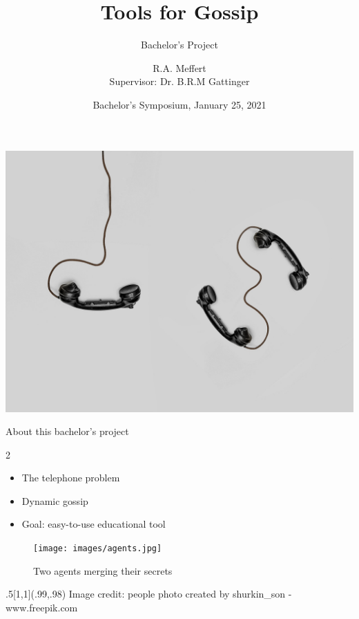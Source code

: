 \documentclass[aspectratio=169]{beamer}
\title{Tools for Gossip}
\subtitle{Bachelor's Project}
\author{%
    R.A. Meffert\\\vspace{5pt}
    {\small Supervisor: Dr. B.R.M Gattinger} 
}
\institute{University of Groningen}
\date{Bachelor's Symposium, January 25, 2021}
\begin{document}
{
{\includegraphics[width=\paperwidth,keepaspectratio]{images/phone.jpg}}
\frame{\titlepage}
}
\begin{frame}[c]{About this bachelor's project}
    \begin{multicols}{2}
        \begin{itemize}
            \item<1-> The telephone problem 
            \item<2-> Dynamic gossip 
            \item<3-> Goal: easy-to-use educational tool
        \end{itemize}
        \columnbreak
        \begin{figure}
            \texttt{[image: images/agents.jpg]}
            \caption{Two agents merging their secrets}
        \end{figure}
    \end{multicols}
    \begin{textblock*}{.5\paperwidth}[1,1](.99\paperwidth,.98\paperheight)
            \hfill \tiny\textcolor{gray!50}{Image credit: people photo created by shurkin\_son - www.freepik.com}
    \end{textblock*}
\end{frame}
\end{document}
